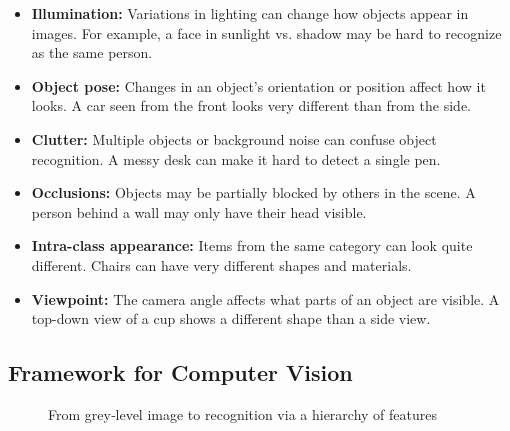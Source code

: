 \begin{itemize}
  \item \textbf{Illumination:} Variations in lighting can change how
    objects appear in images. For example, a face in sunlight vs.
    shadow may be hard to recognize as the same person.

  \item \textbf{Object pose:} Changes in an object's orientation or
    position affect how it looks. A car seen from the front looks
    very different than from the side.

  \item \textbf{Clutter:} Multiple objects or background noise can
    confuse object recognition. A messy desk can make it hard to
    detect a single pen.

  \item \textbf{Occlusions:} Objects may be partially blocked by
    others in the scene. A person behind a wall may only have their
    head visible.

  \item \textbf{Intra-class appearance:} Items from the same category
    can look quite different. Chairs can have very different shapes
    and materials.

  \item \textbf{Viewpoint:} The camera angle affects what parts of an
    object are visible. A top-down view of a cup shows a different
    shape than a side view.
\end{itemize}

\subsection*{Framework for Computer Vision}

\begin{figure}[H]
  \centering
  \caption{From grey‐level image to recognition via a hierarchy of features}
\end{figure}
